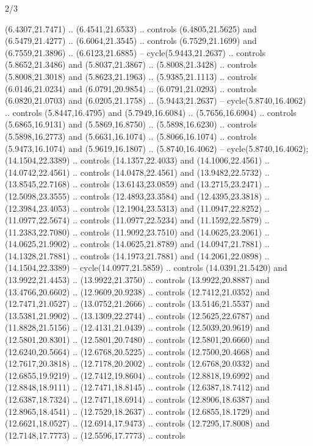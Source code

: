 \begin{flagdescription}{2/3}
\begin{scope}[yshift=\flagwidth,scale=\flagwidth/1241.93737]
\begin{scope}[y=-1mm, x=1mm,draw=gold,fill=blue,line join=miter,miter limit=4,line width=1.8\lw]
{  (6.4307,21.7471) .. (6.4541,21.6533) .. controls (6.4805,21.5625) and
  (6.5479,21.4277) .. (6.6064,21.3545) .. controls (6.7529,21.1699) and
  (6.7559,21.3896) .. (6.6123,21.6885) -- cycle(5.9443,21.2637) .. controls
  (5.8652,21.3486) and (5.8037,21.3867) .. (5.8008,21.3428) .. controls
  (5.8008,21.3018) and (5.8623,21.1963) .. (5.9385,21.1113) .. controls
  (6.0146,21.0234) and (6.0791,20.9854) .. (6.0791,21.0293) .. controls
  (6.0820,21.0703) and (6.0205,21.1758) .. (5.9443,21.2637) --
  cycle(5.8740,16.4062) .. controls (5.8447,16.4795) and (5.7949,16.6084) ..
  (5.7656,16.6904) .. controls (5.6865,16.9131) and (5.5869,16.8750) ..
  (5.5898,16.6230) .. controls (5.5898,16.2773) and (5.6631,16.1074) ..
  (5.8066,16.1074) .. controls (5.9473,16.1074) and (5.9619,16.1807) ..
  (5.8740,16.4062) -- cycle(5.8740,16.4062);
 (14.1504,22.3389) .. controls (14.1357,22.4033)
  and (14.1006,22.4561) .. (14.0742,22.4561) .. controls (14.0478,22.4561) and
  (13.9482,22.5732) .. (13.8545,22.7168) .. controls (13.6143,23.0859) and
  (13.2715,23.2471) .. (12.5098,23.3555) .. controls (12.4893,23.3584) and
  (12.4395,23.3818) .. (12.3984,23.4053) .. controls (12.1904,23.5313) and
  (11.0947,22.8252) .. (11.0977,22.5674) .. controls (11.0977,22.5234) and
  (11.1592,22.5879) .. (11.2383,22.7080) .. controls (11.9092,23.7510) and
  (14.0625,23.2061) .. (14.0625,21.9902) .. controls (14.0625,21.8789) and
  (14.0947,21.7881) .. (14.1328,21.7881) .. controls (14.1973,21.7881) and
  (14.2061,22.0898) .. (14.1504,22.3389) -- cycle(14.0977,21.5859) .. controls
  (14.0391,21.5420) and (13.9922,21.4453) .. (13.9922,21.3750) .. controls
  (13.9922,20.8887) and (13.4766,20.6602) .. (12.9609,20.9238) .. controls
  (12.7412,21.0352) and (12.7471,21.0527) .. (13.0752,21.2666) .. controls
  (13.5146,21.5537) and (13.5381,21.9902) .. (13.1309,22.2744) .. controls
  (12.5625,22.6787) and (11.8828,21.5156) .. (12.4131,21.0439) .. controls
  (12.5039,20.9619) and (12.5801,20.8301) .. (12.5801,20.7480) .. controls
  (12.5801,20.6660) and (12.6240,20.5664) .. (12.6768,20.5225) .. controls
  (12.7500,20.4668) and (12.7617,20.3818) .. (12.7178,20.2002) .. controls
  (12.6768,20.0332) and (12.6855,19.9219) .. (12.7412,19.8604) .. controls
  (12.8818,19.6992) and (12.8848,18.9111) .. (12.7471,18.8145) .. controls
  (12.6387,18.7412) and (12.6387,18.7324) .. (12.7471,18.6914) .. controls
  (12.8906,18.6387) and (12.8965,18.4541) .. (12.7529,18.2637) .. controls
  (12.6855,18.1729) and (12.6621,18.0527) .. (12.6914,17.9473) .. controls
  (12.7295,17.8008) and (12.7148,17.7773) .. (12.5596,17.7773) .. controls
}
\end{scope}
\end{scope}
\end{flagdescription}
